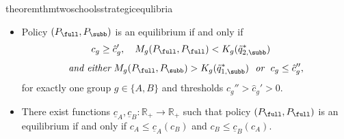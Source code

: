 \begin{restatable}{theorem}{thmtwoschoolsstrategicequlibria}
\begin{itemize}
\item[(ii)] Policy $(P_{\full}, P_{\subb})$ is an equilibrium if and only if
\begin{equation}
\label{eq.condition.drop.twoschools.strategic.J2.1} \begin{split}
       & c_g \geq  \hat{c}'_g,  ~~~
              M_g ({P}_{\full}, P_{\full}) < K_g (\tilde q^*_{2, \subb})
                    \end{split}
        \end{equation}
\begin{equation}
\label{eq.condition.drop.twoschools.strategic.J2.2} \begin{split}
             & \mathrm{~~~\textit{and either}~}  M_g ({P}_{\full}, P_{\subb})  > K_g (\tilde q^*_{1, \subb})
                \mathrm{~~\textit{or}~~} c_g \leq\hat{c}_g'',
        \end{split}
        \end{equation}
        for exactly one group $g \in \{A, B\}$ and  thresholds $ \hat{c}_g'' > \hat{c}_g'>0$.


    \item[(iii)] There exist functions $\underline{c}_A, \underline{c}_B: \mathbb{R}_+ \rightarrow \mathbb{R}_+$
    such that policy $(P_{\full}, P_{\full})$ is an equilibrium if and only if $c_A \leq \underline{c}_A (c_B)$ and $c_B \leq \underline{c}_B (c_A)$.
\end{itemize}
\end{restatable}



